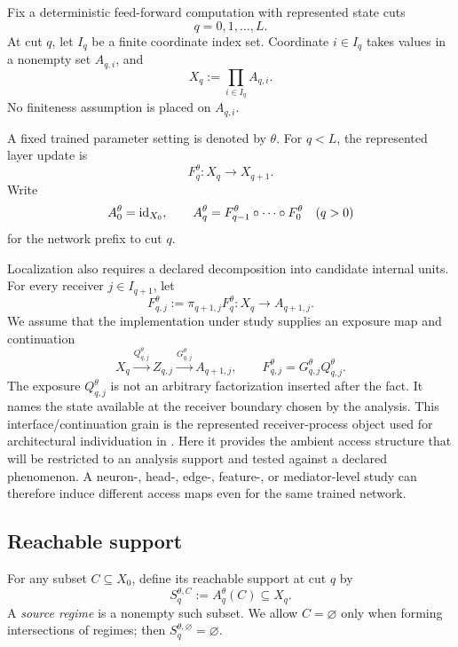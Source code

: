 Fix a deterministic feed-forward computation with represented state cuts
\[
q=0,1,\ldots,L.
\]
At cut $q$, let $I_q$ be a finite coordinate index set. Coordinate $i\in I_q$ takes values in a nonempty set $A_{q,i}$, and
\[
X_q:=\prod_{i\in I_q}A_{q,i}.
\]
No finiteness assumption is placed on $A_{q,i}$.

A fixed trained parameter setting is denoted by $\theta$. For $q<L$, the represented layer update is
\[
F_q^\theta:X_q\to X_{q+1}.
\]
Write
\[
A_0^\theta=\operatorname{id}_{X_0},
\qquad
A_q^\theta=F_{q-1}^\theta\circ\cdots\circ F_0^\theta
\quad(q>0)
\]
for the network prefix to cut $q$.

Localization also requires a declared decomposition into candidate internal units. For every receiver $j\in I_{q+1}$, let
\[
F_{q,j}^\theta:=\pi_{q+1,j}F_q^\theta:X_q\to A_{q+1,j}.
\]
We assume that the implementation under study supplies an exposure map and continuation
\begin{equation}
X_q\xrightarrow{Q_{q,j}^\theta}Z_{q,j}
\xrightarrow{G_{q,j}^\theta}A_{q+1,j},
\qquad
F_{q,j}^\theta=G_{q,j}^\theta Q_{q,j}^\theta.
\label{eq:receiver-factorization}
\end{equation}
The exposure $Q_{q,j}^\theta$ is not an arbitrary factorization inserted after the fact. It names the state available at the receiver boundary chosen by the analysis. This interface/continuation grain is the represented receiver-process object used for architectural individuation in \citet{rosariofreytes2026architecture}. Here it provides the ambient access structure that will be restricted to an analysis support and tested against a declared phenomenon. A neuron-, head-, edge-, feature-, or mediator-level study can therefore induce different access maps even for the same trained network.

\subsection{Reachable support}

\begin{definition}
For any subset $C\subseteq X_0$, define its reachable support at cut $q$ by
\begin{equation}
S_q^{\theta,C}:=A_q^\theta(C)\subseteq X_q.
\label{eq:reachable-support}
\end{equation}
A \emph{source regime} is a nonempty such subset. We allow $C=\varnothing$ only when forming intersections of regimes; then $S_q^{\theta,\varnothing}=\varnothing$.
\end{definition}

